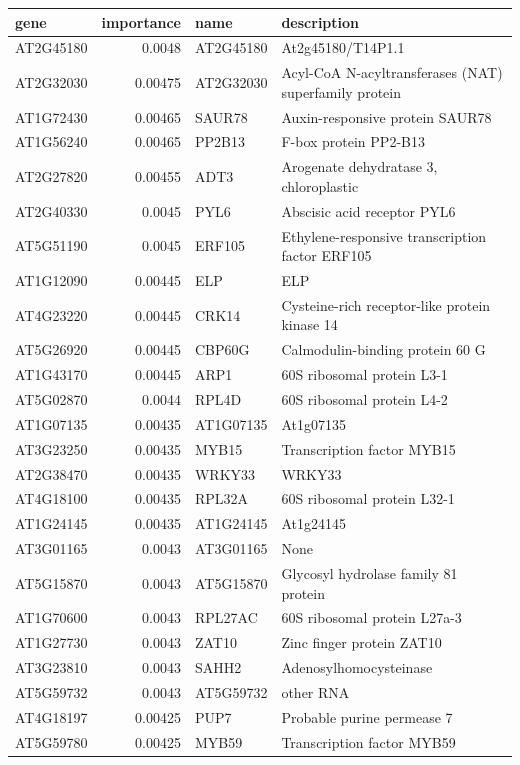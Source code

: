 \documentclass[11pt]{article}
\begin{document}
\begin{center}
\begin{tabular}{lrll}
gene & importance & name & description\\
\hline
AT2G45180 & 0.0048 & AT2G45180 & At2g45180/T14P1.1\\
AT2G32030 & 0.00475 & AT2G32030 & Acyl-CoA N-acyltransferases (NAT) superfamily protein\\
AT1G72430 & 0.00465 & SAUR78 & Auxin-responsive protein SAUR78\\
AT1G56240 & 0.00465 & PP2B13 & F-box protein PP2-B13\\
AT2G27820 & 0.00455 & ADT3 & Arogenate dehydratase 3, chloroplastic\\
AT2G40330 & 0.0045 & PYL6 & Abscisic acid receptor PYL6\\
AT5G51190 & 0.0045 & ERF105 & Ethylene-responsive transcription factor ERF105\\
AT1G12090 & 0.00445 & ELP & ELP\\
AT4G23220 & 0.00445 & CRK14 & Cysteine-rich receptor-like protein kinase 14\\
AT5G26920 & 0.00445 & CBP60G & Calmodulin-binding protein 60 G\\
AT1G43170 & 0.00445 & ARP1 & 60S ribosomal protein L3-1\\
AT5G02870 & 0.0044 & RPL4D & 60S ribosomal protein L4-2\\
AT1G07135 & 0.00435 & AT1G07135 & At1g07135\\
AT3G23250 & 0.00435 & MYB15 & Transcription factor MYB15\\
AT2G38470 & 0.00435 & WRKY33 & WRKY33\\
AT4G18100 & 0.00435 & RPL32A & 60S ribosomal protein L32-1\\
AT1G24145 & 0.00435 & AT1G24145 & At1g24145\\
AT3G01165 & 0.0043 & AT3G01165 & None\\
AT5G15870 & 0.0043 & AT5G15870 & Glycosyl hydrolase family 81 protein\\
AT1G70600 & 0.0043 & RPL27AC & 60S ribosomal protein L27a-3\\
AT1G27730 & 0.0043 & ZAT10 & Zinc finger protein ZAT10\\
AT3G23810 & 0.0043 & SAHH2 & Adenosylhomocysteinase\\
AT5G59732 & 0.0043 & AT5G59732 & other RNA\\
AT4G18197 & 0.00425 & PUP7 & Probable purine permease 7\\
AT5G59780 & 0.00425 & MYB59 & Transcription factor MYB59\\

\end{tabular}
\end{center}
\end{document}
